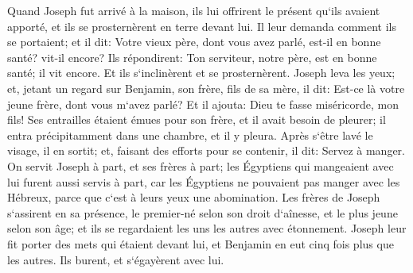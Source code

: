 \verse Quand Joseph fut arrivé à la maison, ils lui offrirent le présent qu`ils avaient apporté, et ils se prosternèrent en terre devant lui. 
\verse Il leur demanda comment ils se portaient; et il dit: Votre vieux père, dont vous avez parlé, est-il en bonne santé? vit-il encore? 
\verse Ils répondirent: Ton serviteur, notre père, est en bonne santé; il vit encore. Et ils s`inclinèrent et se prosternèrent. 
\verse Joseph leva les yeux; et, jetant un regard sur Benjamin, son frère, fils de sa mère, il dit: Est-ce là votre jeune frère, dont vous m`avez parlé? Et il ajouta: Dieu te fasse miséricorde, mon fils! 
\verse Ses entrailles étaient émues pour son frère, et il avait besoin de pleurer; il entra précipitamment dans une chambre, et il y pleura. 
\verse Après s`être lavé le visage, il en sortit; et, faisant des efforts pour se contenir, il dit: Servez à manger. 
\verse On servit Joseph à part, et ses frères à part; les Égyptiens qui mangeaient avec lui furent aussi servis à part, car les Égyptiens ne pouvaient pas manger avec les Hébreux, parce que c`est à leurs yeux une abomination. 
\verse Les frères de Joseph s`assirent en sa présence, le premier-né selon son droit d`aînesse, et le plus jeune selon son âge; et ils se regardaient les uns les autres avec étonnement. 
\verse Joseph leur fit porter des mets qui étaient devant lui, et Benjamin en eut cinq fois plus que les autres. Ils burent, et s`égayèrent avec lui. 

